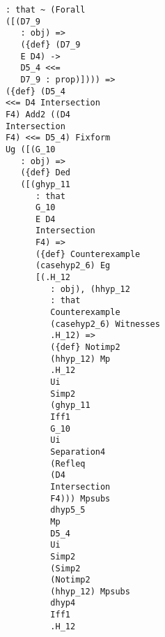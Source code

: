 \documentclass[12pt]{article}
\begin{document}
\begin{verbatim}
                               : that ~ (Forall 
                               ([(D7_9 
                                  : obj) => 
                                  ({def} (D7_9 
                                  E D4) -> 
                                  D5_4 <<= 
                                  D7_9 : prop)]))) => 
                               ({def} (D5_4 
                               <<= D4 Intersection 
                               F4) Add2 ((D4 
                               Intersection 
                               F4) <<= D5_4) Fixform 
                               Ug ([(G_10 
                                  : obj) => 
                                  ({def} Ded 
                                  ([(ghyp_11 
                                     : that 
                                     G_10 
                                     E D4 
                                     Intersection 
                                     F4) => 
                                     ({def} Counterexample 
                                     (casehyp2_6) Eg 
                                     [(.H_12 
                                        : obj), (hhyp_12 
                                        : that 
                                        Counterexample 
                                        (casehyp2_6) Witnesses 
                                        .H_12) => 
                                        ({def} Notimp2 
                                        (hhyp_12) Mp 
                                        .H_12 
                                        Ui 
                                        Simp2 
                                        (ghyp_11 
                                        Iff1 
                                        G_10 
                                        Ui 
                                        Separation4 
                                        (Refleq 
                                        (D4 
                                        Intersection 
                                        F4))) Mpsubs 
                                        dhyp5_5 
                                        Mp 
                                        D5_4 
                                        Ui 
                                        Simp2 
                                        (Simp2 
                                        (Notimp2 
                                        (hhyp_12) Mpsubs 
                                        dhyp4 
                                        Iff1 
                                        .H_12 

\end{verbatim}
\end{document}
